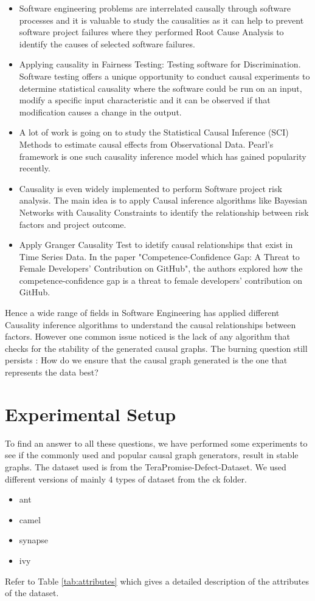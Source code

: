 \documentclass[sigconf,review,anonymous,nonacm=true]{acmart}
\begin{document}
\begin{itemize}
    \item Software engineering problems are interrelated causally through software processes and it is valuable to study the causalities as it can help to prevent software project failures \cite{Per} where they performed Root Cause Analysis\cite{P2} to identify the causes of selected software failures.
    \item Applying causality in Fairness Testing: Testing software for Discrimination.\cite{FT}  Software testing offers a unique opportunity to conduct causal experiments to determine statistical causality where the software could be run on an input, modify a specific input characteristic and it can be observed if that modification causes a change in the output.
    \item A lot of work is going on to study the Statistical Causal Inference (SCI) Methods to estimate causal effects from Observational Data. \cite{Ap} Pearl's framework is one such causality inference model which has gained popularity recently. 
    \item Causality is even widely implemented to perform Software project risk analysis. The main idea is to apply Causal inference algorithms like Bayesian Networks with Causality Constraints\cite{BNCC} to identify the relationship between risk factors and project outcome.
    \item Apply Granger Causality Test to idetify causal relationships that exist in Time Series Data. In the paper "Competence-Confidence Gap: A Threat to Female Developers’ Contribution on GitHub"\cite{CC}, the authors explored how the competence-confidence gap is a threat to female developers’ contribution on GitHub. 
\end{itemize}
Hence a wide range of fields in Software Engineering has applied different Causality inference algorithms to understand the causal relationships between factors. However one common issue noticed is the lack of any algorithm that checks for the stability of the generated causal graphs. The burning question still persists : How do we ensure that the causal graph generated is the one that represents the data best? 
\section{Experimental Setup}
To find an answer to all these questions, we have performed some experiments to see if the commonly used and popular causal graph generators, result in stable graphs. The dataset used is from the TeraPromise-Defect-Dataset\cite{DT}. We used different versions of mainly 4 types of dataset from the ck folder. 
\begin{itemize}
    \item ant 
    \item camel
    \item synapse
    \item ivy
\end{itemize}
Refer to Table \ref{tab:attributes} which gives a detailed description of the attributes\cite{D} of the dataset.
\end{document}
